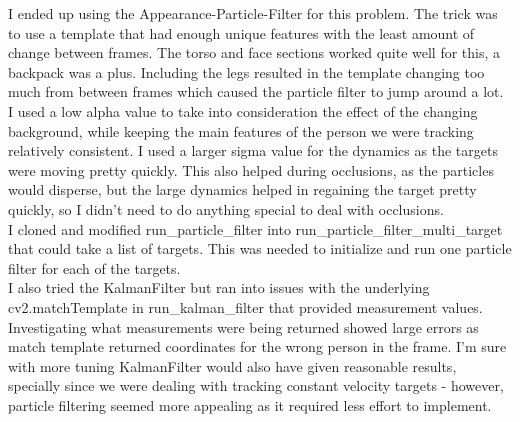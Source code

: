 \setlength{\parskip}{\baselineskip}%
I ended up using the Appearance-Particle-Filter for this problem. The trick was to use a template that had enough unique features with the least amount of change between frames. The torso and face sections worked quite well for this, a backpack was a plus. Including the legs resulted in the template changing too much from between frames which caused the particle filter to jump around a lot. I used a low alpha value to take into consideration the effect of the changing background, while keeping the main features of the person we were tracking relatively consistent. I used a larger sigma value for the dynamics as the targets were moving pretty quickly. This also helped during occlusions, as the particles would disperse, but the large dynamics helped in regaining the target pretty quickly, so I didn't need to do anything special to deal with occlusions.\\

I cloned and modified run\_particle\_filter into run\_particle\_filter\_multi\_target that could take a list of targets. This was needed to initialize and run one particle filter for each of the targets. \\

I also tried the KalmanFilter but ran into issues with the underlying cv2.matchTemplate in run\_kalman\_filter that provided measurement values. Investigating what measurements were being returned showed large errors as match template returned coordinates for the wrong person in the frame. I'm sure with more tuning KalmanFilter would also have given reasonable results, specially since we were dealing with tracking constant velocity targets - however, particle filtering seemed more appealing as it required less effort to implement. \\
